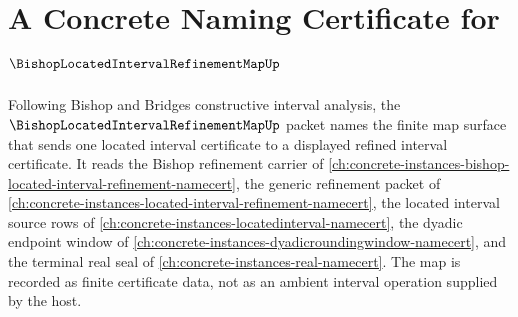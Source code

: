 \chapter{A Concrete Naming Certificate for $\BishopLocatedIntervalRefinementMapUp$}
\label{ch:concrete-instances-bishop-located-interval-refinement-map-namecert}

Following Bishop and Bridges constructive interval analysis, the $\BishopLocatedIntervalRefinementMapUp$ packet names the finite map surface that sends one located interval certificate to a displayed refined interval certificate. It reads the Bishop refinement carrier of \autoref{ch:concrete-instances-bishop-located-interval-refinement-namecert}, the generic refinement packet of \autoref{ch:concrete-instances-located-interval-refinement-namecert}, the located interval source rows of \autoref{ch:concrete-instances-locatedinterval-namecert}, the dyadic endpoint window of \autoref{ch:concrete-instances-dyadicroundingwindow-namecert}, and the terminal real seal of \autoref{ch:concrete-instances-real-namecert}. The map is recorded as finite certificate data, not as an ambient interval operation supplied by the host.

